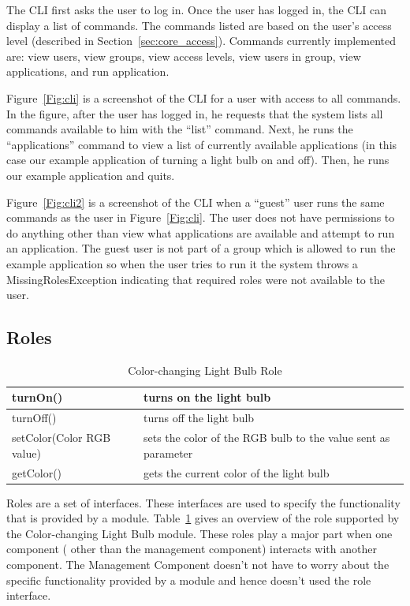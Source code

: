 The CLI first asks the user to log in. Once the user has logged in, the CLI can
display a list of commands. The commands listed are based on the user's access
level (described in Section~\ref{sec:core_access}). Commands currently
implemented are: view users, view groups, view access levels, view users in
group, view applications, and run application.

Figure~\ref{Fig:cli} is a screenshot of the CLI for a user with access to all
commands. In the figure, after the user has logged in, he requests that the
system lists all commands available to him with the ``list'' command. Next, he
runs the ``applications'' command to view a list of currently available
applications (in this case our example application of turning a light bulb on
and off). Then, he runs our example application and quits.

Figure~\ref{Fig:cli2} is a screenshot of the CLI when a ``guest'' user runs the
same commands as the user in Figure~\ref{Fig:cli}. The user does not have
permissions to do anything other than view what applications are available and
attempt to run an application. The guest user is not part of a group which is
allowed to run the example application so when the user tries to run it the
system throws a MissingRolesException indicating that required roles were not
available to the user.
\subsection{Roles}
\label{sec:rolesimpl}
\begin{table}
\begin{center}
\begin{tabular}{| p{2.5cm} | p{4.5cm} |}
\hline
turnOn() & turns on the light bulb\\ \hline
turnOff() & turns off the light bulb\\ \hline
setColor(Color RGB value) & sets the color of the RGB bulb to the value sent as
parameter \\ \hline
getColor() & gets the current color of the light bulb \\ \hline
\end{tabular}
\end{center}
\caption{Color-changing Light Bulb Role}
\label{tab:rolestable}
\end{table}
Roles are a set of interfaces. These interfaces are used to specify the
functionality that is provided by a module. Table~\ref{tab:rolestable} gives an
overview of the role supported by the Color-changing Light Bulb module. These
roles play a major part when one component ( other than the management
component) interacts with another component. The Management Component doesn't
not have to worry about the specific functionality provided by a module and
hence doesn't used the role interface.
